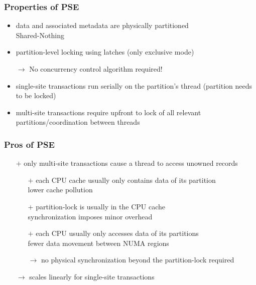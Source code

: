\begin{frame}
	\frametitle{Properties of PSE}
	
	\begin{itemize}
		\item	data and associated metadata are physically partitioned \\ \bm{$\rightarrow$} Shared-Nothing
		\item	partition-level locking using latches (only exclusive mode)
		\item[$\rightarrow$]	No concurrency control algorithm required!
		\item	single-site transactions run serially on the partition's thread (partition needs to be locked)
		\item	multi-site transactions require upfront to lock of all relevant partitions/coordination between threads
	\end{itemize}
\end{frame}

\begin{frame}
	\frametitle{Pros of PSE}
	
	\begin{itemize}
		\item[$+$]	only multi-site transactions cause a thread to access unowned records
			\begin{itemize}
				\item[$+$]	each CPU cache usually only contains data of its partition \\ \bm{$\rightarrow$} lower cache pollution
				\item[$+$]	partition-lock is usually in the CPU cache \\ \bm{$\rightarrow$} synchronization imposes minor overhead
				\item[$+$]	each CPU usually only accesses data of its partitions \\ \bm{$\rightarrow$} fewer data movement between NUMA regions
				\item[$\rightarrow$]	no physical synchronization beyond the partition-lock required
			\end{itemize}
		\item[$\rightarrow$]	scales linearly for single-site transactions
	\end{itemize}
\end{frame}

